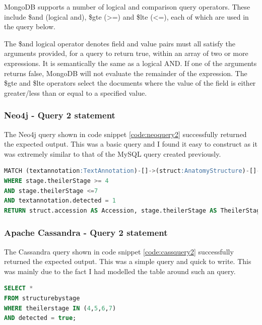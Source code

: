 MongoDB supports a number of logical and comparison query operators. These include \$and (logical and), \$gte (>=) and \$lte (<=), each of which are used in the query below.

\parindent 15pt

The \$and logical operator denotes field and value pairs must all satisfy the arguments provided, for a query to return true, within an array of two or more expressions. It is semantically the same as a logical AND. If one of the arguments returns false, MongoDB will not evaluate the remainder of the expression. The \$gte and \$lte operators select the documents where the value of the field is either greater/less than or equal to a specified value.

\subsubsection*{Neo4j - Query 2 statement}\label{neoquery2statement}
The Neo4j query shown in code snippet \ref{code:neoquery2} successfully returned the expected output. This was a basic query and I found it easy to construct as it was extremely similar to that of the MySQL query created previously.

\begin{lstlisting}[language=SQL, caption=Neo4j query 2 statement. All structures between Theiler Stage X and Y., label=code:neoquery2]
MATCH (textannotation:TextAnnotation)-[]->(struct:AnatomyStructure)-[]->(stage:Stage)
WHERE stage.theilerStage >= 4
AND stage.theilerStage <=7
AND textannotation.detected = 1
RETURN struct.accession AS Accession, stage.theilerStage AS TheilerStage;
\end{lstlisting}

\subsubsection*{Apache Cassandra - Query 2 statement}\label{cassquery2statement}
The Cassandra query shown in code snippet \ref{code:cassquery2} successfully returned the expected output. This was a simple query and quick to write. This was mainly due to the fact I had modelled the table around such an query.

\begin{lstlisting}[language=SQL, caption=Cassandra query 2 statement. All structures between Theiler Stage X and Y., label=code:cassquery2]
SELECT *
FROM structurebystage
WHERE theilerstage IN (4,5,6,7)
AND detected = true;
\end{lstlisting}

